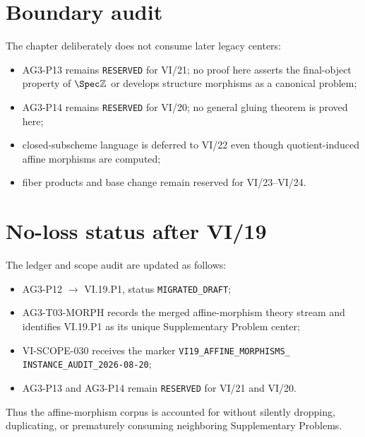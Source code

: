 \section*{Boundary audit}
The chapter deliberately does not consume later legacy centers:
\begin{itemize}
\item AG3-P13 remains \texttt{RESERVED} for VI/21; no proof here asserts the final-object
property of $\Spec\mathbb Z$ or develops structure morphisms as a canonical problem;
\item AG3-P14 remains \texttt{RESERVED} for VI/20; no general gluing theorem is proved here;
\item closed-subscheme language is deferred to VI/22 even though quotient-induced affine
morphisms are computed;
\item fiber products and base change remain reserved for VI/23--VI/24.
\end{itemize}

\section*{No-loss status after VI/19}
The ledger and scope audit are updated as follows:
\begin{itemize}
\item AG3-P12 $\to$ VI.19.P1, status \texttt{MIGRATED\_DRAFT};
\item AG3-T03-MORPH records the merged affine-morphism theory stream and identifies VI.19.P1
as its unique Supplementary Problem center;
\item VI-SCOPE-030 receives the marker
\texttt{VI19\_AFFINE\_MORPHISMS\_}\\
\texttt{INSTANCE\_AUDIT\_2026-08-20};
\item AG3-P13 and AG3-P14 remain \texttt{RESERVED} for VI/21 and VI/20.
\end{itemize}
Thus the affine-morphism corpus is accounted for without silently dropping, duplicating, or
prematurely consuming neighboring Supplementary Problems.
